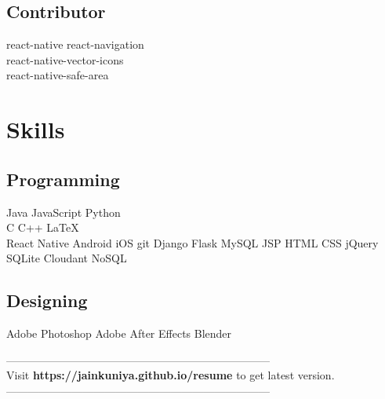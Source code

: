 \documentclass[a4paper]{deedy-resume} %
\begin{document}
\begin{minipage}[t]{0.33\textwidth}
    \sectionspace %
    
    \subsection{Contributor}
    
    \textbullet{} react-native 
    \textbullet{} react-navigation \\
    \textbullet{} react-native-vector-icons \\
    \textbullet{} react-native-safe-area 
    
    \sectionspace %
    
    
    \section{Skills}
    
    \subsection{Programming}
    
    Java \textbullet{} JavaScript \textbullet{} Python\\
    C \textbullet{} C++ \textbullet{} \LaTeX\ \\ 
    React Native \textbullet{} Android \textbullet{} iOS \textbullet{} git \textbullet{} Django \textbullet{} Flask \textbullet{} MySQL \textbullet{} JSP \textbullet{} HTML \textbullet{} CSS \textbullet{} jQuery \textbullet{} SQLite \textbullet{} Cloudant NoSQL
    
    \sectionspace %
    
    \subsection{Designing}
    Adobe Photoshop \textbullet{} Adobe After Effects \textbullet{} Blender
    
    \sectionspace %
    
    \sectionspace %
    \sectionspace %
    \sectionspace %
    ------------------------------------------------------------------------\\
    Visit {\bf https://jainkuniya.github.io/resume} to get latest version.\\
    ------------------------------------------------------------------------\\
    \end{minipage} %
\end{document}
